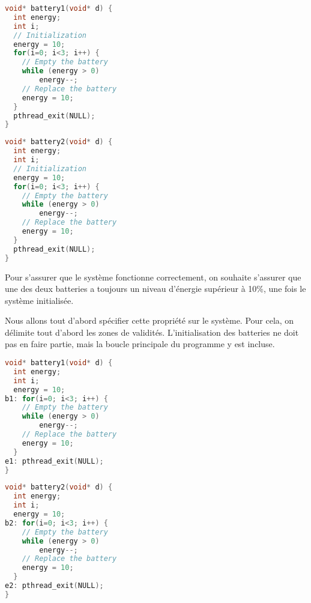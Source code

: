 \noindent\begin{minipage}{.45\textwidth}
\begin{lstlisting}[language=C, frame=single, caption=Thread 1]
void* battery1(void* d) {
  int energy;
  int i;
  // Initialization
  energy = 10;
  for(i=0; i<3; i++) {
    // Empty the battery
    while (energy > 0)
        energy--;
    // Replace the battery
    energy = 10;
  }
  pthread_exit(NULL);
}
\end{lstlisting}
\end{minipage}\hfill
\begin{minipage}{.45\textwidth}
\begin{lstlisting}[language=C, frame=single, caption=Thread 2]
void* battery2(void* d) {
  int energy;
  int i;
  // Initialization
  energy = 10;
  for(i=0; i<3; i++) {
    // Empty the battery
    while (energy > 0)
        energy--;
    // Replace the battery
    energy = 10;
  }
  pthread_exit(NULL);
}
\end{lstlisting}
\end{minipage}

Pour s'assurer que le système fonctionne correctement, on souhaite s'assurer que
une des deux batteries a toujours un niveau d'énergie supérieur à 10\%, une fois
le système initialisée.

Nous allons tout d'abord spécifier cette propriété sur le système. Pour cela, on
délimite tout d'abord les zones de validités. L'initialisation des batteries ne
doit pas en faire partie, mais la boucle principale du programme y est incluse.

\noindent\begin{minipage}{.45\textwidth}
\begin{lstlisting}[language=C, frame=single, caption=Thread 1 avec labels]
void* battery1(void* d) {
  int energy;
  int i;
  energy = 10;
b1: for(i=0; i<3; i++) {
    // Empty the battery
    while (energy > 0)
        energy--;
    // Replace the battery
    energy = 10;
  }
e1: pthread_exit(NULL);
}
\end{lstlisting}
\end{minipage}\hfill
\begin{minipage}{.45\textwidth}
\begin{lstlisting}[language=C, frame=single, caption=Thread 2 avec labels]
void* battery2(void* d) {
  int energy;
  int i;
  energy = 10;
b2: for(i=0; i<3; i++) {
    // Empty the battery
    while (energy > 0)
        energy--;
    // Replace the battery
    energy = 10;
  }
e2: pthread_exit(NULL);
}
\end{lstlisting}
\end{minipage}

